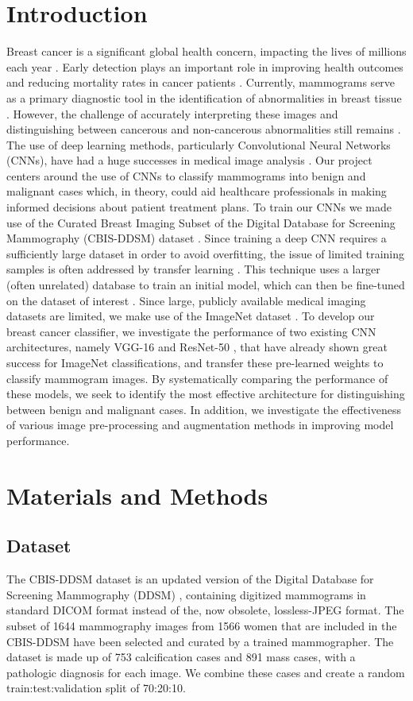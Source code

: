 \documentclass[sn-mathphys,Numbered]{sn-jnl}%
\theoremstyle{thmstyleone}%
\theoremstyle{thmstyletwo}%
\theoremstyle{thmstylethree}%
\begin{document}
\section{Introduction}
\label{Introduction}
Breast cancer is a significant global health concern, impacting the lives of millions each year \cite{siegel2023cancer}. Early detection plays an important role in improving health outcomes and reducing mortality rates in cancer patients \cite{Mathew2018}. Currently, mammograms serve as a primary diagnostic tool in the identification of abnormalities in breast tissue \cite{Mathew2018}. However, the challenge of accurately interpreting these images and distinguishing between cancerous and non-cancerous abnormalities still remains \cite{elter2009}. The use of deep learning methods, particularly Convolutional Neural Networks (CNNs), have had a huge successes in medical image analysis \cite{Cai2020-hn}. Our project centers around the use of CNNs to classify mammograms into benign and malignant cases which, in theory, could aid healthcare professionals in making informed decisions about patient treatment plans. To train our CNNs we made use of the Curated Breast Imaging Subset of the Digital Database for Screening Mammography (CBIS-DDSM) dataset \cite{Lee2017-hi}. Since training a deep CNN requires a sufficiently large dataset in order to avoid overfitting, the issue of limited training samples is often addressed by transfer learning \cite{Kim2022-ge}. This technique uses a larger (often unrelated) database to train an initial model, which can then be fine-tuned on the dataset of interest \cite{Kim2022-ge}. Since large, publicly available medical imaging datasets are limited, we make use of the ImageNet dataset \cite{Deng2009-vj}. To develop our breast cancer classifier, we investigate the performance of two existing CNN architectures, namely VGG-16 \cite{simonyan2015deep} and ResNet-50 \cite{he2015deep}, that have already shown great success for ImageNet classifications, and transfer these pre-learned weights to classify mammogram images. By systematically comparing the performance of these models, we seek to identify the most effective architecture for distinguishing between benign and malignant cases. In addition, we investigate the effectiveness of various image pre-processing and augmentation methods in improving model performance.
\section{Materials and Methods}
\label{Materials}
\subsection{Dataset}
\label{Dataset}
The CBIS-DDSM dataset \cite{Lee2017-hi} is an updated version of the Digital Database for Screening Mammography (DDSM) \cite{Heath2007THEDD}, containing digitized mammograms  in standard DICOM format instead of the, now obsolete, lossless-JPEG format. The subset of 1644 mammography images from 1566 women that are included in the CBIS-DDSM have been selected and curated by a trained mammographer. The dataset is made up of 753 calcification cases and 891 mass cases, with a pathologic diagnosis for each image. We combine these cases and create a random train:test:validation split of 70:20:10.
\end{document}
